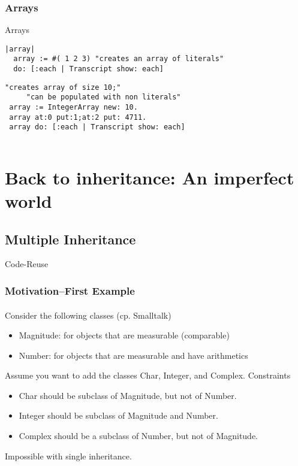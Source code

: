 \documentclass[handout]{beamer}
\newcommand{\Blue}[1]{\color{blue}#1\color{black}}
\begin{document}
\begin{frame}[fragile]
\frametitle{Arrays}

\Blue{Arrays}\medskip

\begin{lstlisting}[language=Smalltalk]
|array| 
  array := #( 1 2 3) "creates an array of literals"
  do: [:each | Transcript show: each] 
\end{lstlisting} 



\begin{lstlisting}[language=Smalltalk]
 "creates array of size 10;"
     "can be populated with non literals"
 array := IntegerArray new: 10. 
 array at:0 put:1;at:2 put: 4711.
 array do: [:each | Transcript show: each] 
  
\end{lstlisting} 

\end{frame}

\section{Back to inheritance: An imperfect world}

\subsection{Multiple Inheritance}
\begin{frame}[fragile]
\begin{center}\Huge Code-Reuse\end{center}
\end{frame}

\begin{frame}[fragile]
\frametitle{Motivation--First Example}
\framesubtitle{}
Consider the following classes (cp. Smalltalk)
\begin{itemize}
\item Magnitude: for objects that are measurable (comparable)
\item Number: for objects that are measurable and have arithmetics
\end{itemize}
Assume you want to add the classes Char, Integer, and Complex.
Constraints
\begin{itemize}
\item Char should be subclass of Magnitude, but not of Number.
\item Integer should be subclass of Magnitude and Number.
\item Complex should be a subclass of Number, but not of Magnitude.
\end{itemize}
Impossible with single inheritance.
\end{frame}
\end{document}

